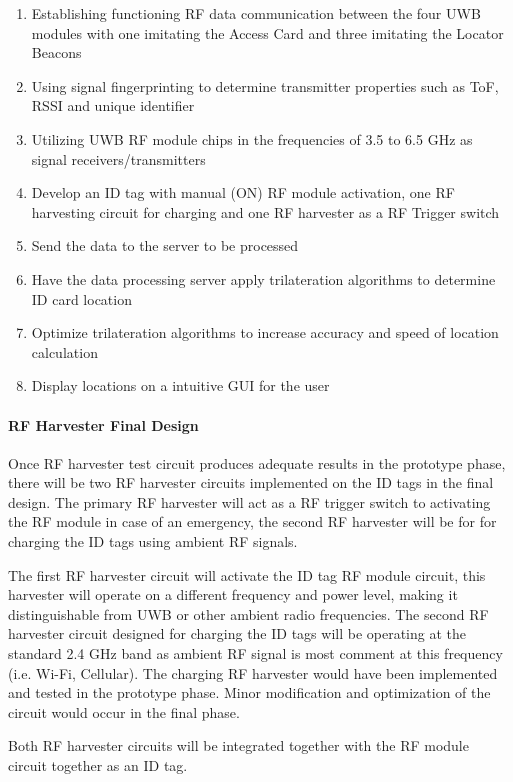 \begin{enumerate}
    \item Establishing functioning RF data communication between the four UWB modules with
    one imitating the Access Card and three imitating the Locator Beacons
    \item Using signal fingerprinting to determine transmitter properties such as ToF, RSSI
    and unique identifier
    \item Utilizing UWB RF module chips in the frequencies of 3.5 to 6.5 GHz as signal receivers/transmitters
    \item Develop an ID tag with manual (ON) RF module activation, one RF harvesting circuit
    for charging and one RF harvester as a RF Trigger switch
    \item Send the data to the server to be processed
    \item Have the data processing server apply trilateration algorithms to determine ID card location
    \item Optimize trilateration algorithms to increase accuracy and speed of location calculation
    \item Display locations on a intuitive GUI for the user
\end{enumerate}

\break
\paragraph{RF Harvester Final Design}
\bigskip
Once RF harvester test circuit produces adequate results in the prototype phase, there will be two RF harvester circuits implemented on the ID tags in the final design. The primary RF harvester will act as a RF trigger switch to activating the RF module in case of an emergency, the second RF harvester will be for for charging the ID tags using ambient RF signals.

\bigskip
The first RF harvester circuit will activate the ID tag RF module circuit, this harvester will operate
on a different frequency and power level, making it distinguishable from UWB or other ambient radio frequencies. The second RF harvester circuit designed for charging the ID tags will be operating at the standard 2.4 GHz band  as ambient RF signal is most comment at this frequency (i.e. Wi-Fi, Cellular). The charging RF harvester would have been implemented and tested in the prototype phase. Minor modification and optimization of the circuit would occur in the final phase.

\bigskip
Both RF harvester circuits will be integrated together with the RF module circuit together as an ID tag.

